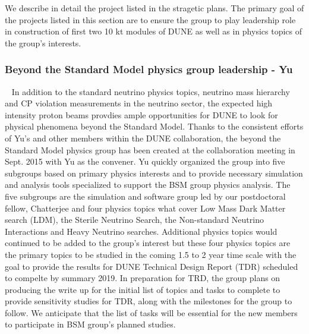 We describe in detail the project listed in the stragetic plans.   The primary goal of the projects listed in this section are to ensure
the group to play leadership role in construction of first two 10 kt modules of DUNE as well as in physics topics of the group's 
interests.  
%
%
\subsubsection {Beyond the Standard Model physics group leadership - Yu}~\label{ss:dune-bsm}
In addition to the standard neutrino physics topics, neutrino mass hierarchy and CP violation measurements in the neutrino sector, the 
expected high intensity proton beams provdies ample opportunities for DUNE to look for physical phenomena beyond the Standard Model.
Thanks to the consistent efforts of Yu's and other members within the DUNE collaboration, the beyond the Standard Model physics group 
has been created at the collaboration meeting in Sept. 2015 with Yu as the convener.
Yu quickly organized the group into five subgroups based on primary physics interests and to provide necessary
simulation and analysis tools specialized to support the BSM group physics analysis.
The five subgroups are the simulation and software group led by our postdoctoral fellow, Chatterjee and four physics topics what cover
Low Mass Dark Matter search (LDM), the Sterile Neutrino Search, the Non-standard Neutrino Interactions and Heavy Neutrino searches.
Additional physics topics would continued to be added to the group's interest but these four physics topics are the primary topics to be
studied in the coming 1.5 to 2 year time scale with the goal to provide the results for DUNE Technical Design Report (TDR) scheduled to compelte
by summary 2019.
In preparation for TRD, the group plans on producing the write up for the initial list of topics and tasks to complete to provide
sensitivity studies for TDR, along with the milestones for the group to follow.
We anticipate that the list of tasks will be essential for the new members to participate in BSM group's planned studies.
%
%

